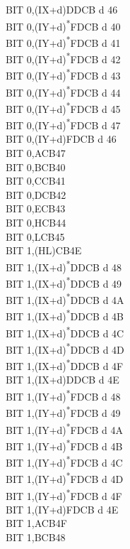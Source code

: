 \documentclass[oneside,a4paper]{book}
\begin{document}
\begin{multicols}{3}
{\begin{tabbing}
BIT 0,(IX+d)\>DDCB d 46\\
BIT 0,(IY+d)\textsuperscript{*}\>FDCB d 40\\
BIT 0,(IY+d)\textsuperscript{*}\>FDCB d 41\\
BIT 0,(IY+d)\textsuperscript{*}\>FDCB d 42\\
BIT 0,(IY+d)\textsuperscript{*}\>FDCB d 43\\
BIT 0,(IY+d)\textsuperscript{*}\>FDCB d 44\\
BIT 0,(IY+d)\textsuperscript{*}\>FDCB d 45\\
BIT 0,(IY+d)\textsuperscript{*}\>FDCB d 47\\
BIT 0,(IY+d)\>FDCB d 46\\
BIT 0,A\>CB47\\
BIT 0,B\>CB40\\
BIT 0,C\>CB41\\
BIT 0,D\>CB42\\
BIT 0,E\>CB43\\
BIT 0,H\>CB44\\
BIT 0,L\>CB45\\
BIT 1,(HL)\>CB4E\\
BIT 1,(IX+d)\textsuperscript{*}\>DDCB d 48\\
BIT 1,(IX+d)\textsuperscript{*}\>DDCB d 49\\
BIT 1,(IX+d)\textsuperscript{*}\>DDCB d 4A\\
BIT 1,(IX+d)\textsuperscript{*}\>DDCB d 4B\\
BIT 1,(IX+d)\textsuperscript{*}\>DDCB d 4C\\
BIT 1,(IX+d)\textsuperscript{*}\>DDCB d 4D\\
BIT 1,(IX+d)\textsuperscript{*}\>DDCB d 4F\\
BIT 1,(IX+d)\>DDCB d 4E\\
BIT 1,(IY+d)\textsuperscript{*}\>FDCB d 48\\
BIT 1,(IY+d)\textsuperscript{*}\>FDCB d 49\\
BIT 1,(IY+d)\textsuperscript{*}\>FDCB d 4A\\
BIT 1,(IY+d)\textsuperscript{*}\>FDCB d 4B\\
BIT 1,(IY+d)\textsuperscript{*}\>FDCB d 4C\\
BIT 1,(IY+d)\textsuperscript{*}\>FDCB d 4D\\
BIT 1,(IY+d)\textsuperscript{*}\>FDCB d 4F\\
BIT 1,(IY+d)\>FDCB d 4E\\
BIT 1,A\>CB4F\\
BIT 1,B\>CB48\\

\end{tabbing}}
\end{multicols}
\end{document}
